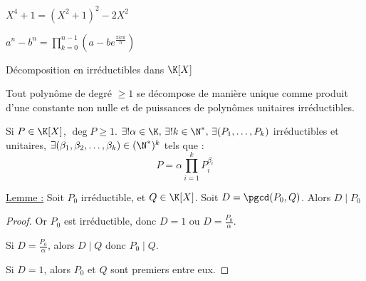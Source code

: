 \avspace $X^4 + 1 = (X^2 + 1)^2 - 2X^2$

$\displaystyle a^n - b^n = \prod_{k = 0}^{n - 1} \left(a - b e^{\frac{2i\pi k} n}\right)$

\begin{theoreme}{Décomposition en irréductibles dans $\K[X]$}{}

    Tout polynôme de degré $\geqslant 1$ se décompose de manière unique comme produit d'une constante 
    non nulle et de puissances de polynômes unitaires irréductibles. 

    Si $ P \in \K[X]$, $\deg P \geqslant 1$. 
    $\exists ! \alpha \in \K, \, \exists ! k \in \N^*, \, \exists (P_1, \ldots, P_k)$ irréductibles et unitaires, 
    $\exists (\beta_1, \beta_2, \ldots, \beta_k) \in (\N^*)^k$ tels que :
    \[P = \alpha \prod_{i = 1}^k P_i^{\beta_i}\]
\end{theoreme}


\uline{Lemme :} Soit $P_0$ irréductible, et $Q \in \K[X]$. Soit $D = \pgcd(P_0, Q)$.
Alors $D \mid P_0$

\begin{proof}
    Or $P_0$ est irréductible, donc $D = 1$ ou $D = \frac {P_0} \alpha$.

    Si $D = \frac {P_0} \alpha$, alors $D \mid Q$ donc $P_0 \mid Q$.

    Si $D = 1$, alors $P_0$ et $Q$ sont premiers entre eux.
\end{proof}

